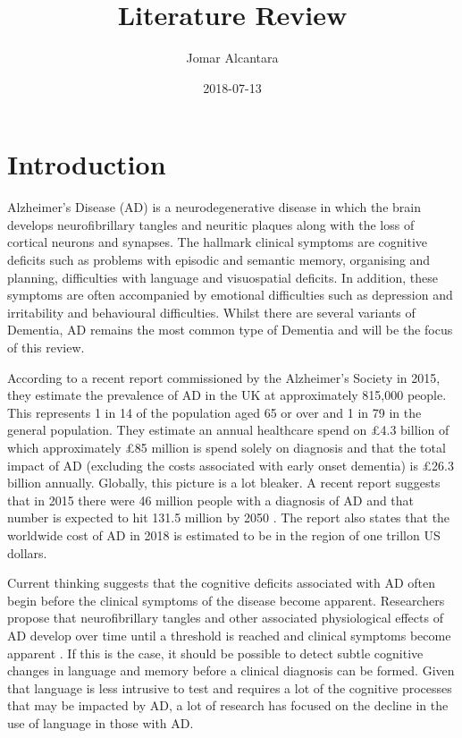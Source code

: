 \documentclass[a4paper]{article}
\title{Literature Review}
\date{2018-07-13}
\author{Jomar Alcantara}
\begin{document}
\maketitle
\newpage
\tableofcontents
\newpage
\section{Introduction}
\par
Alzheimer's Disease (AD) is a neurodegenerative disease in which the brain develops neurofibrillary tangles and neuritic plaques along with the loss of cortical neurons and synapses. The hallmark clinical symptoms are cognitive deficits such as problems with episodic and semantic memory, organising and planning, difficulties with language and visuospatial deficits\cite{AmericanPsychiatricAssociation2013}. In addition, these symptoms are often accompanied by emotional difficulties such as depression and irritability and behavioural difficulties. Whilst there are several variants of Dementia, AD remains the most common type of Dementia and will be the focus of this review. \newline
\par
According to a recent report commissioned by the Alzheimer's Society in 2015, they estimate the prevalence of AD in the UK at approximately 815,000 people. This represents 1 in 14 of the population aged 65 or over and 1 in 79 in the general population. They estimate an annual healthcare spend on £4.3 billion of which approximately £85 million is spend solely on diagnosis and that the total impact of AD (excluding the costs associated with early onset dementia) is £26.3 billion annually. Globally, this picture is a lot bleaker. A recent report suggests that in 2015 there were 46 million people with a diagnosis of AD and that number is expected to hit 131.5 million by 2050 \cite{Prince2015}. The report also states that the worldwide cost of AD in 2018 is estimated to be in the region of one trillon US dollars. \newline
\par
Current thinking suggests that the cognitive deficits associated with AD often begin before the clinical symptoms of the disease become apparent. Researchers propose that neurofibrillary tangles and other associated physiological effects of AD develop over time until a threshold is reached and clinical symptoms become apparent \cite{Nestor2006}. If this is the case, it should be possible to detect subtle cognitive changes in language and memory before a clinical diagnosis can be formed. Given that language is less intrusive to test and requires a lot of the cognitive processes that may be impacted by AD, a lot of research has focused on the decline in the use of language in those with AD.  \newline
\end{document}
